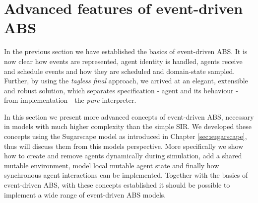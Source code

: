 \section{Advanced features of event-driven ABS}
\label{sec:advanced_eventdriven_ABS}

In the previous section we have established the basics of event-driven ABS. It is now clear how events are represented, agent identity is handled, agents receive and schedule events and how they are scheduled and domain-state sampled. Further, by using the \textit{tagless final} approach, we arrived at an elegant, extensible and robust solution, which separates specification - agent and its behaviour - from implementation - the \textit{pure} interpreter. 

In this section we present more advanced concepts of event-driven ABS, necessary in models with much higher complexity than the simple SIR. We developed these concepts using the Sugarscape model as introduced in Chapter \ref{sec:sugarscape}, thus will discuss them from this models perspective. More specifically we show how to create and remove agents dynamically during simulation, add a shared mutable environment, model local mutable agent state and finally how synchronous agent interactions can be implemented. Together with the basics of event-driven ABS, with these concepts established it should be possible to implement a wide range of event-driven ABS models.









